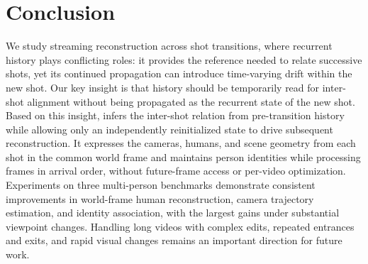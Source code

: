 \FloatBarrier
\section{Conclusion}

We study streaming reconstruction across shot transitions, where recurrent
history plays conflicting roles: it provides the reference needed to relate
successive shots, yet its continued propagation can introduce time-varying
drift within the new shot. Our key insight is that history should be
temporarily read for inter-shot alignment without being propagated as the
recurrent state of the new shot. Based on this insight, \method{} infers the
inter-shot relation from pre-transition history while allowing only an
independently reinitialized state to drive subsequent reconstruction. It
expresses the cameras, humans, and scene geometry from each shot in the common
world frame and maintains person identities while processing frames in
arrival order, without future-frame access or per-video optimization.
Experiments on three multi-person benchmarks demonstrate consistent
improvements in world-frame human reconstruction, camera trajectory
estimation, and identity association, with the largest gains under substantial
viewpoint changes. Handling long videos with complex edits, repeated entrances
and exits, and rapid visual changes remains an important direction for future
work.
